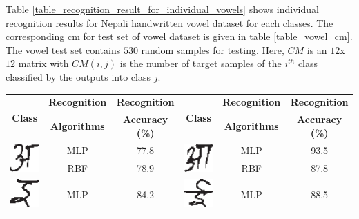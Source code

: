 \pagebreak
Table \ref{table_recognition_result_for_individual_vowels} shows individual recognition results for Nepali handwritten vowel dataset for each classes. The corresponding \ac{cm}  for test set of vowel dataset is given in table \ref{table_vowel_cm}. The vowel test set contains $530$ random samples for testing. Here, $CM$ is an $12$x$12$ matrix with $CM(i,j)$ is the number of target samples of the $i^{th}$ class classified by the outputs into class $j$.

\begin{table}[h]
\centering
\begin{tabular}{|c|c|c|c|c|c|}
\hline
\multirow{2}{*}{\textbf{Class}} & \textbf{Recognition} & \textbf{Recognition } & \multirow{2}{*}{\textbf{Class}} & \textbf{Recognition} & \textbf{Recognition }\tabularnewline
 & \textbf{Algorithms} & \textbf{Accuracy (\%)} &  & \textbf{Algorithms} & \textbf{Accuracy (\%)}\tabularnewline
\hline
\multirow{2}{*}{\includegraphics[scale=0.25]{figures/datasets/nhcr/vowels/1a}} & MLP & 77.8 & \multirow{2}{*}{\includegraphics[scale=0.25]{figures/datasets/nhcr/vowels/2aa}} & MLP & 93.5\tabularnewline
\cline{2-3} \cline{5-6}
 & RBF & 78.9 &  & RBF & 87.8\tabularnewline
\hline
\multirow{2}{*}{\includegraphics[scale=0.25]{figures/datasets/nhcr/vowels/3i}} & MLP & 84.2 & \multirow{2}{*}{\includegraphics[scale=0.25]{figures/datasets/nhcr/vowels/4ee}} & MLP & 88.5\tabularnewline

\end{tabular}
\end{table}
